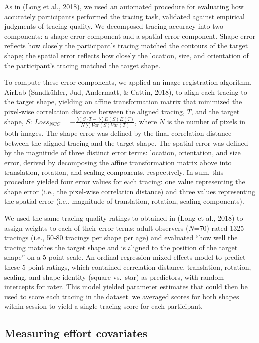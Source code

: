 \documentclass[
  english,
  man]{apa6}
\begin{document}
As in (Long et al., 2018), we used an automated procedure for evaluating how accurately participants performed the tracing task, validated against empirical judgments of tracing quality. We decomposed tracing accuracy into two components: a shape error component and a spatial error component. Shape error reflects how closely the participant's tracing matched the contours of the target shape; the spatial error reflects how closely the location, size, and orientation of the participant's tracing matched the target shape.

To compute these error components, we applied an image registration algorithm, AirLab (Sandkühler, Jud, Andermatt, \& Cattin, 2018), to align each tracing to the target shape, yielding an affine transformation matrix that minimized the pixel-wise correlation distance between the aligned tracing, \(T\), and the target shape, \(S\): \(Loss_{NCC} = - \frac{\sum S \cdot T - \sum E(S) E(T)}{N \sum Var(S) Var(T)}\), where \(N\) is the number of pixels in both images. The shape error was defined by the final correlation distance between the aligned tracing and the target shape. The spatial error was defined by the magnitude of three distinct error terms: location, orientation, and size error, derived by decomposing the affine transformation matrix above into translation, rotation, and scaling components, respectively. In sum, this procedure yielded four error values for each tracing: one value representing the shape error (i.e., the pixel-wise correlation distance) and three values representing the spatial error (i.e., magnitude of translation, rotation, scaling components).

We used the same tracing quality ratings to obtained in (Long et al., 2018) to assign weights to each of their error terms; adult observers (\(N\)=70) rated 1325 tracings (i.e., 50-80 tracings per shape per age) and evaluated \enquote{how well the tracing matches the target shape and is aligned to the position of the target shape} on a 5-point scale. An ordinal regression mixed-effects model to predict these 5-point ratings, which contained correlation distance, translation, rotation, scaling, and shape identity (square vs.~star) as predictors, with random intercepts for rater. This model yielded parameter estimates that could then be used to score each tracing in the dataset; we averaged scores for both shapes within session to yield a single tracing score for each participant.

\hypertarget{measuring-effort-covariates}{%
\subsection{Measuring effort covariates}\label{measuring-effort-covariates}}
\end{document}
